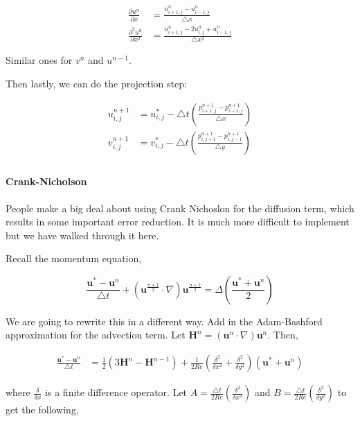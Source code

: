 \documentclass[12pt]{article}
\begin{document}
\begin{align*}
    \frac{\partial u^n}{\partial x} &= \frac{u^n_{i+1,j} - u^n_{i-1,j}}{\bigtriangleup x} \\
    \frac{\partial^2 u^n}{\partial x^2} &= \frac{u^n_{i+1,j} - 2u^n_{i,j} + u^n_{i-1,j}}{\bigtriangleup x^2}
\end{align*}

Similar ones for $v^n$ and $u^{n-1}$.

Then lastly, we can do the projection step:

\begin{align*}
    u^{n+1}_{i,j} &= u^*_{i,j} - \bigtriangleup t (\frac{p^{n+1}_{i+1,j} - p^{n+1}_{i-1,j}}{\bigtriangleup x}) \\
    v^{n+1}_{i,j} &= v^*_{i,j} - \bigtriangleup t (\frac{p^{n+1}_{i,j+1} - p^{n+1}_{i,j-1}}{\bigtriangleup y}) \\
\end{align*}

\paragraph{Crank-Nicholson}
People make a big deal about using Crank Nichoslon for the diffusion term, which results in some important error reduction. It is much more difficult to implement but we have walked through it here.

Recall the momentum equation,

\begin{equation}
    \frac{\mathbf{u}^* - \mathbf{u}^n}{\bigtriangleup t} + (\mathbf{u}^{\frac{n+1}{2}} \cdot \nabla) \mathbf{u}^{\frac{n+1}{2}} = \Delta (\frac{\mathbf{u}^* + \mathbf{u}^n}{2})
\end{equation}

We are going to rewrite this in a different way. Add in the Adam-Bashford approximation for the advection term. Let $\mathbf{H}^n = (\mathbf{u}^{n} \cdot \nabla) \mathbf{u}^{n}$. Then,

\begin{align*}
    \frac{\mathbf{u}^* - \mathbf{u}^n}{\bigtriangleup t} &= \frac{1}{2}(3\mathbf{H}^n - \mathbf{H}^{n-1}) + \frac{1}{2Re}(\frac{\delta^2}{\delta x^2} + \frac{\delta^2}{\delta y^2})(\mathbf{u}^* + \mathbf{u}^n)
\end{align*}

where $\frac{\delta}{\delta x}$ is a finite difference operator. Let $A = \frac{\bigtriangleup t}{2 Re}(\frac{\delta^2}{\delta x^2})$ and $B = \frac{\bigtriangleup t}{2 Re}(\frac{\delta^2}{\delta y^2})$ to get the following,
\end{document}
